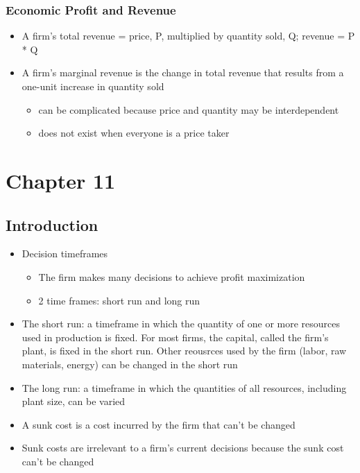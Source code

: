 \documentclass[11pt]{article}
\begin{document}
\subsubsection{Economic Profit and Revenue}
\label{sec:org93a39ad}
\begin{itemize}
\item A firm's total revenue = price, P, multiplied by quantity sold, Q; revenue = P * Q
\item A firm's marginal revenue is the change in total revenue that results from a one-unit increase in quantity sold
\begin{itemize}
\item can be complicated because price and quantity may be interdependent
\item does not exist when everyone is a price taker
\end{itemize}
\end{itemize}
\section{Chapter 11}
\label{sec:orgeb7e27d}
\subsection{Introduction}
\label{sec:org5cd2ea4}
\begin{itemize}
\item Decision timeframes
\begin{itemize}
\item The firm makes many decisions to achieve profit maximization
\item 2 time frames: short run and long run
\end{itemize}
\item The short run: a timeframe in which the quantity of one or more resources used in production is fixed. For most firms, the capital, called the firm's plant, is fixed in the short run. Other reousrces used by the firm (labor, raw materials, energy) can be changed in the short run
\item The long run: a timeframe in which the quantities of all resources, including plant size, can be varied
\item A sunk cost is a cost incurred by the firm that can't be changed
\item Sunk costs are irrelevant to a firm's current decisions because the sunk cost can't be changed
\end{itemize}
\end{document}
